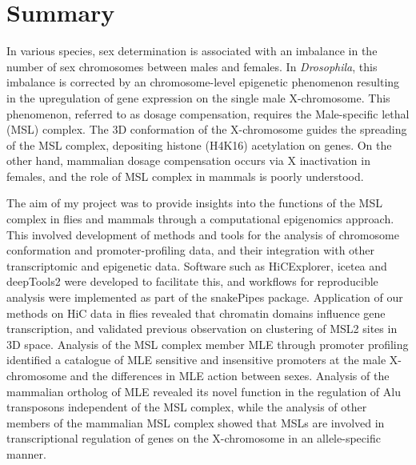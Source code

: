 \documentclass[11pt,twoside]{MPIthesis}
\theoremstyle{definition}
\theoremstyle{definition}
\theoremstyle{definition}
\theoremstyle{remark}
\begin{document}
  \listoffigures


{
  
}


%
\mainmatter %
\pagestyle{fancyplain} %


\chapter{Summary}\label{summary}

 In various species, sex determination is associated
with an imbalance in the number of sex chromosomes between males and
females. In \emph{Drosophila}, this imbalance is corrected by an
chromosome-level epigenetic phenomenon resulting in the upregulation of
gene expression on the single male X-chromosome. This phenomenon,
referred to as dosage compensation, requires the Male-specific lethal
(MSL) complex. The 3D conformation of the X-chromosome guides the
spreading of the MSL complex, depositing histone (H4K16) acetylation on
genes. On the other hand, mammalian dosage compensation occurs via X
inactivation in females, and the role of MSL complex in mammals is
poorly understood.

The aim of my project was to provide insights into the functions of the
MSL complex in flies and mammals through a computational epigenomics
approach. This involved development of methods and tools for the
analysis of chromosome conformation and promoter-profiling data, and
their integration with other transcriptomic and epigenetic data.
Software such as HiCExplorer, icetea and deepTools2 were developed to
facilitate this, and workflows for reproducible analysis were
implemented as part of the snakePipes package. Application of our
methods on HiC data in flies revealed that chromatin domains influence
gene transcription, and validated previous observation on clustering of
MSL2 sites in 3D space. Analysis of the MSL complex member MLE through
promoter profiling identified a catalogue of MLE sensitive and
insensitive promoters at the male X-chromosome and the differences in
MLE action between sexes. Analysis of the mammalian ortholog of MLE
revealed its novel function in the regulation of Alu transposons
independent of the MSL complex, while the analysis of other members of
the mammalian MSL complex showed that MSLs are involved in
transcriptional regulation of genes on the X-chromosome in an
allele-specific manner.
\end{document}
